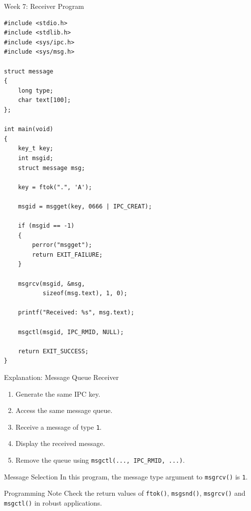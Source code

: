 \documentclass[aspectratio=169,10pt]{beamer}
\begin{document}
\begin{frame}[fragile]{Week 7: Receiver Program}

\begin{lstlisting}[style=cstyle]
#include <stdio.h>
#include <stdlib.h>
#include <sys/ipc.h>
#include <sys/msg.h>

struct message
{
    long type;
    char text[100];
};

int main(void)
{
    key_t key;
    int msgid;
    struct message msg;

    key = ftok(".", 'A');

    msgid = msgget(key, 0666 | IPC_CREAT);

    if (msgid == -1)
    {
        perror("msgget");
        return EXIT_FAILURE;
    }

    msgrcv(msgid, &msg,
           sizeof(msg.text), 1, 0);

    printf("Received: %s", msg.text);

    msgctl(msgid, IPC_RMID, NULL);

    return EXIT_SUCCESS;
}
\end{lstlisting}

\end{frame}

\begin{frame}{Explanation: Message Queue Receiver}

\begin{enumerate}
    \item Generate the same IPC key.
    \item Access the same message queue.
    \item Receive a message of type \texttt{1}.
    \item Display the received message.
    \item Remove the queue using
    \texttt{msgctl(..., IPC\_RMID, ...)}.
\end{enumerate}

\begin{block}{Message Selection}
In this program, the message type argument
to \texttt{msgrcv()} is \texttt{1}.
\end{block}

\begin{alertblock}{Programming Note}
Check the return values of \texttt{ftok()},
\texttt{msgsnd()}, \texttt{msgrcv()} and
\texttt{msgctl()} in robust applications.
\end{alertblock}

\end{frame}
\end{document}
